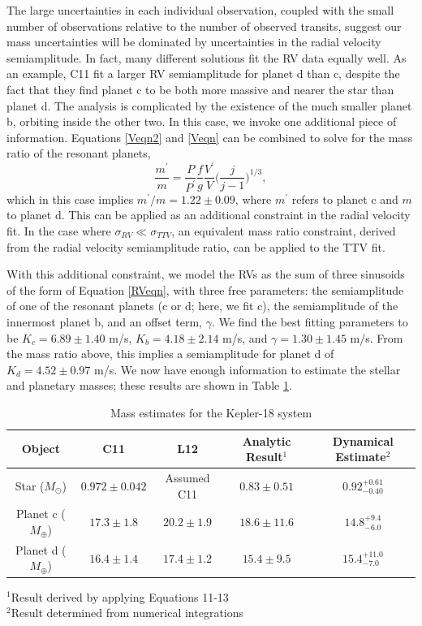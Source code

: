 The large uncertainties in each individual observation, coupled with the small number of observations relative to the number of observed transits, suggest our mass uncertainties will be dominated by uncertainties in the radial velocity semiamplitude. In fact, many different solutions fit the RV data equally well. As an example, C11 fit a larger RV semiamplitude for planet d than c, despite the fact that they find planet c to be both more massive and nearer the star than planet d. The analysis is complicated by the existence of the much smaller planet b, orbiting inside the other two. In this case, we invoke one additional piece of information. Equations \ref{Veqn2} and \ref{Veqn} can be combined to solve for the mass ratio of the resonant planets, 
\begin{equation}
\frac{m^\prime}{m} = \frac{P}{P^\prime} \frac{f}{g} \frac{V^\prime}{V} \bigg(\frac{j}{j-1}\bigg)^{1/3},
\label{Mratio}
\end{equation}
which in this case implies $m^\prime/m = 1.22 \pm 0.09$, where $m^\prime$ refers to planet c and $m$ to planet d. This can be applied as an additional constraint in the radial velocity fit. In the case where $\sigma_{RV} \ll \sigma_{TTV}$, an equivalent mass ratio constraint, derived from the radial velocity semiamplitude ratio, can be applied to the TTV fit. 

With this additional constraint, we model the RVs as the sum of three sinusoids of the form of Equation \ref{RVeqn}, with three free parameters: the semiamplitude of one of the resonant planets (c or d; here, we fit c), the semiamplitude of the innermost planet b, and an offset term, $\gamma$. We find the best fitting parameters to be $K_c = 6.89 \pm 1.40$ m/s, $K_b = 4.18 \pm 2.14$ m/s, and $\gamma = 1.30 \pm 1.45$ m/s. From the mass ratio above, this implies a semiamplitude for planet d of $K_d = 4.52 \pm 0.97$ m/s. We now have enough information to estimate the stellar and planetary masses; these results are shown in Table \ref{ExampRes}. 

\begin{table}[hbt!]
\footnotesize
\begin{center}
\begin{tabular}{ccccc}
\hline
Object & C11 & L12 & Analytic Result$^{1}$ & Dynamical Estimate$^2$ \\
\hline
        Star ($M_\odot$) & $0.972 \pm 0.042$ & Assumed C11 &  $0.83 \pm 0.51$ & $0.92 ^{+ 0.61} _{-0.40}$ \\
        Planet c ($M_\oplus$) & $17.3 \pm 1.8$ & $20.2 \pm 1.9$ & $18.6 \pm 11.6 $ & $14.8 ^{+9.4} _{-6.0}$ \\
        Planet d ($M_\oplus$) & $16.4 \pm 1.4 $ & $17.4\pm 1.2$ & $15.4 \pm 9.5 $ & $15.4 ^{+11.0} _{-7.0}$ \\
\hline
\end{tabular}
\end{center}
        $^1$Result derived by applying Equations 11-13 \\
        $^2$Result determined from numerical integrations 
        
\caption{Mass estimates for the Kepler-18 system}
\label{ExampRes}
\end{table}


